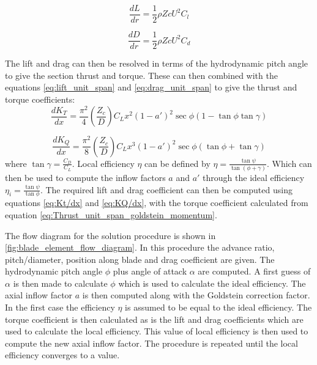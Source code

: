 \documentclass[]{report}
\begin{document}
 \begin{equation}
 \frac{dL}{dr} = \frac{1}{2} \rho Z c U^2 C_l
 \label{eq:lift_unit_span}
 \end{equation}
 
  \begin{equation}
 \frac{dD}{dr} = \frac{1}{2} \rho Z c U^2 C_d
 \label{eq:drag_unit_span}
 \end{equation}
 
 The lift and drag can then be resolved in terms of the hydrodynamic pitch angle to give the section thrust and torque. These can then combined with the equations \ref{eq:lift_unit_span} and \ref{eq:drag_unit_span} to give the thrust and torque coefficients: 
\begin{equation}
\frac{dK_T}{dx} = \frac{\pi^2}{4} (\frac{Z_c}{D}) C_L x^2 (1 - a')^2 \sec\phi (1 - \tan \phi \tan \gamma)
\label{eq:Kt/dx}
\end{equation} 

\begin{equation}
\frac{dK_Q}{dx} = \frac{\pi^2}{8} (\frac{Z_c}{D}) C_L x^3 (1 - a')^2 \sec\phi (\tan \phi + \tan \gamma)
\label{eq:KQ/dx}
\end{equation} 
 where $\tan \gamma = \frac{C_D}{C_L}$. Local efficiency $\eta$ can be defined by $\eta = \frac{\tan\psi }{\tan (\phi + \gamma)}$. Which can then be used to compute the inflow factors $a$ and $a'$ through the ideal efficiency $\eta_i = \frac{\tan \psi}{\tan \phi}$. The required lift and drag coefficient can then be computed using equations \ref{eq:Kt/dx} and \ref{eq:KQ/dx}, with the torque coefficient calculated from equation \ref{eq:Thrust_unit_span_goldstein_momentum}.
 
 The flow diagram for the solution procedure is shown in \ref{fig:blade_element_flow_diagram}. In this procedure the advance ratio, pitch/diameter, position along blade and drag coefficient are given. The hydrodynamic pitch angle $\phi$ plus angle of attack $\alpha$ are computed. A first guess of $\alpha$ is then made to calculate $\phi$ which is used to calculate the ideal efficiency. The axial inflow factor $a$ is then computed along with the Goldstein correction factor. In the first case the efficiency $\eta$ is assumed to be equal to the ideal efficiency. The torque coefficient is then calculated as is the lift and drag coefficients which are used to calculate the local efficiency. This value of local efficiency is then used to compute the new axial inflow factor. The procedure is repeated until the local efficiency converges to a value.
 
\end{document}
